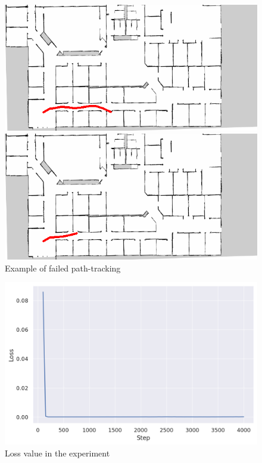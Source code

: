 \begin{figure}[h]
  \begin{minipage}[b]{0.45\linewidth}
    \centering
    \includegraphics[keepaspectratio, scale=0.35]{images/694_520_0128/traject9.png}
    \subcaption{}
  \end{minipage}
  \begin{minipage}[b]{0.45\linewidth}
    \centering
    \includegraphics[keepaspectratio, scale=0.35]{images/694_520_0128/traject22.png}
    \subcaption{}
  \end{minipage}
\caption{Example of failed path-tracking}
\label{Fig:fail}
\end{figure}

\newpage
\begin{figure}[h]
  \centering
  \includegraphics[keepaspectratio, scale=0.4]{images/694_520_9.png}
  \caption{Loss value in the experiment}
  \label{Fig:sample}
\end{figure}

